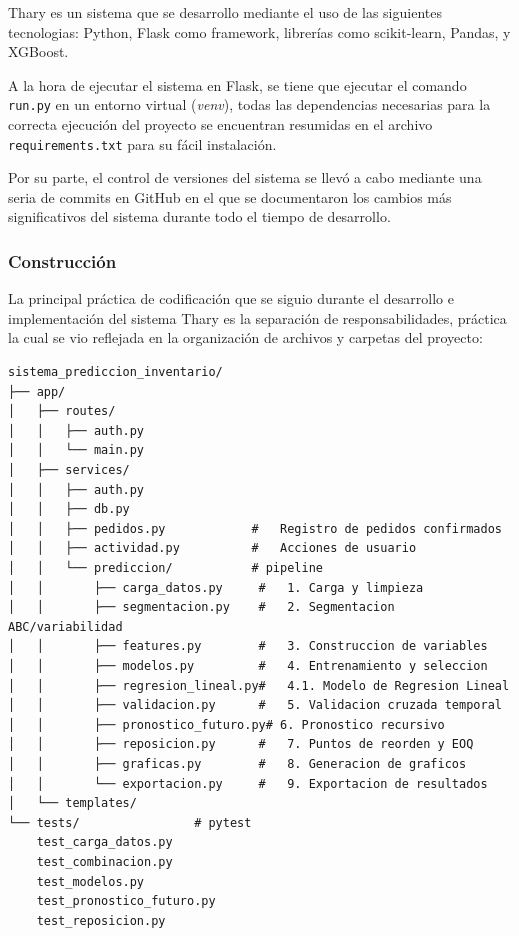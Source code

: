 
Thary es un sistema que se desarrollo mediante el uso de las siguientes tecnologias: Python, Flask como framework, librerías como scikit-learn, Pandas, y XGBoost. 

A la hora de ejecutar el sistema en Flask, se tiene que ejecutar el comando \texttt{run.py} en un entorno virtual (\textit{venv}), todas las dependencias necesarias para la correcta ejecución del proyecto se encuentran resumidas en el archivo \texttt{requirements.txt} para su fácil instalación. 

Por su parte, el control de versiones del sistema se llevó a cabo mediante una seria de commits en GitHub en el que se documentaron los cambios más significativos del sistema durante todo el tiempo de desarrollo. 

\subsubsection{Construcción}

La principal práctica de codificación que se siguio durante el desarrollo e implementación del sistema Thary es la separación de responsabilidades, práctica la cual se vio reflejada en la organización de archivos y carpetas del proyecto:

\begin{verbatim}
sistema_prediccion_inventario/
├── app/
│   ├── routes/                 
│   │   ├── auth.py            
│   │   └── main.py            
│   ├── services/                
│   │   ├── auth.py              
│   │   ├── db.py                
│   │   ├── pedidos.py            #   Registro de pedidos confirmados
│   │   ├── actividad.py          #   Acciones de usuario
│   │   └── prediccion/           # pipeline
│   │       ├── carga_datos.py     #   1. Carga y limpieza
│   │       ├── segmentacion.py    #   2. Segmentacion ABC/variabilidad
│   │       ├── features.py        #   3. Construccion de variables
│   │       ├── modelos.py         #   4. Entrenamiento y seleccion
│   │       ├── regresion_lineal.py#   4.1. Modelo de Regresion Lineal
│   │       ├── validacion.py      #   5. Validacion cruzada temporal
│   │       ├── pronostico_futuro.py# 6. Pronostico recursivo
│   │       ├── reposicion.py      #   7. Puntos de reorden y EOQ
│   │       ├── graficas.py        #   8. Generacion de graficos
│   │       └── exportacion.py     #   9. Exportacion de resultados
│   └── templates/                
└── tests/                # pytest
    test_carga_datos.py
    test_combinacion.py
    test_modelos.py
    test_pronostico_futuro.py
    test_reposicion.py
\end{verbatim}

